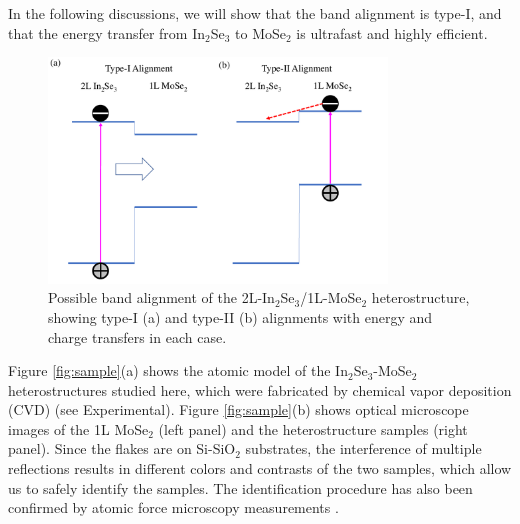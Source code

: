 \documentclass[journal=jacsat,manuscript=article]{achemso}
\begin{document}
In the following discussions, we will show that the band alignment is type-I, and that the energy transfer from In$_2$Se$_3$ to MoSe$_2$ is ultrafast and highly efficient.

\begin{figure}
  \centering
  \includegraphics[width=9cm]{alignment.pdf}
  \caption{Possible band alignment of the 2L-In$_2$Se$_3$/1L-MoSe$_2$ heterostructure, showing type-I (a) and type-II (b) alignments with energy and charge transfers in each case.}
    \label{fig:alignment}
\end{figure}

Figure \ref{fig:sample}(a) shows the atomic model of the In$_2$Se$_3$-MoSe$_2$  heterostructures studied here, which were fabricated by chemical vapor deposition (CVD) \cite{cjcp30325} (see Experimental). Figure \ref{fig:sample}(b) shows optical microscope images of the 1L MoSe$_2$ (left panel) and the heterostructure samples (right panel). Since the flakes are on Si-SiO$_2$ substrates, the interference of multiple reflections results in different colors and contrasts of the two samples, which allow us to safely identify the samples. The identification  procedure has also been confirmed by atomic force microscopy measurements  \cite{cjcp30325}.
\end{document}
